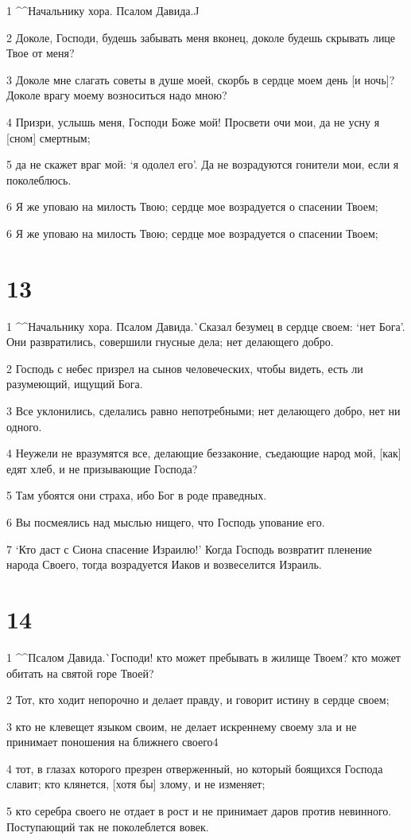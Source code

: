 \par 1 ^^Начальнику хора. Псалом Давида.^^
\par 2 Доколе, Господи, будешь забывать меня вконец, доколе будешь скрывать лице Твое от меня?
\par 3 Доколе мне слагать советы в душе моей, скорбь в сердце моем день [и ночь]? Доколе врагу моему возноситься надо мною?
\par 4 Призри, услышь меня, Господи Боже мой! Просвети очи мои, да не усну я [сном] смертным;
\par 5 да не скажет враг мой: `я одолел его'. Да не возрадуются гонители мои, если я поколеблюсь.
\par 6 Я же уповаю на милость Твою; сердце мое возрадуется о спасении Твоем;
\par 6 Я же уповаю на милость Твою; сердце мое возрадуется о спасении Твоем;

\chapter{13}

\par 1 ^^Начальнику хора. Псалом Давида.^^ Сказал безумец в сердце своем: `нет Бога'. Они развратились, совершили гнусные дела; нет делающего добро.
\par 2 Господь с небес призрел на сынов человеческих, чтобы видеть, есть ли разумеющий, ищущий Бога.
\par 3 Все уклонились, сделались равно непотребными; нет делающего добро, нет ни одного.
\par 4 Неужели не вразумятся все, делающие беззаконие, съедающие народ мой, [как] едят хлеб, и не призывающие Господа?
\par 5 Там убоятся они страха, ибо Бог в роде праведных.
\par 6 Вы посмеялись над мыслью нищего, что Господь упование его.
\par 7 `Кто даст с Сиона спасение Израилю!' Когда Господь возвратит пленение народа Своего, тогда возрадуется Иаков и возвеселится Израиль.

\chapter{14}

\par 1 ^^Псалом Давида.^^ Господи! кто может пребывать в жилище Твоем? кто может обитать на святой горе Твоей?
\par 2 Тот, кто ходит непорочно и делает правду, и говорит истину в сердце своем;
\par 3 кто не клевещет языком своим, не делает искреннему своему зла и не принимает поношения на ближнего своего4
\par 4 тот, в глазах которого презрен отверженный, но который боящихся Господа славит; кто клянется, [хотя бы] злому, и не изменяет;
\par 5 кто серебра своего не отдает в рост и не принимает даров против невинного. Поступающий так не поколеблется вовек.

